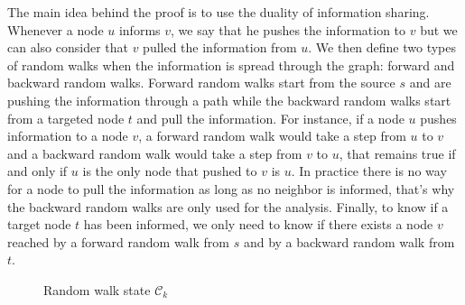 \documentclass[10pt,journal,a4paper]{IEEEtran}
\begin{document}
The main idea behind the proof is to use the duality of information sharing. Whenever a node $u$ informs $v$, we say that he pushes the information to $v$ but we can also consider that $v$ pulled the information from $u$. We then define two types of random walks when the information is spread through the graph: forward and backward random walks. Forward random walks start from the source $s$ and are pushing the information through a path while the backward random walks start from a targeted node $t$ and pull the information. For instance, if a node $u$ pushes information to a node $v$, a forward random walk would take a step from $u$ to $v$ and a backward random walk would take a step from $v$ to $u$, that remains true if and only if $u$ is the only node that pushed to $v$ is $u$. In practice there is no way for a node to pull the information as long as no neighbor is informed, that's why the backward random walks are only used for the analysis. Finally, to know if a target node $t$ has been informed, we only need to know if there exists a node $v$ reached by a forward random walk from $s$ and by a backward random walk from $t$.


\begin{figure}[h]
\centering
{}
\caption{Random walk state $\mathcal C_k$}
\label{fig:lazyFSM}
\end{figure}
\end{document}
